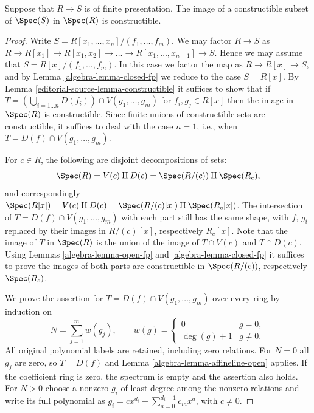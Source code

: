 \begin{theorem}
\label{editorial-source-theorem-chevalley}
Suppose that $R \to S$ is of finite presentation.
The image of a constructible subset of
$\Spec(S)$ in $\Spec(R)$ is constructible.
\end{theorem}

\begin{proof}
Write $S = R[x_1, \ldots, x_n]/(f_1, \ldots, f_m)$.
We may factor $R \to S$ as $R \to R[x_1] \to R[x_1, x_2]
\to \ldots \to R[x_1, \ldots, x_{n-1}] \to S$. Hence
we may assume that $S = R[x]/(f_1, \ldots, f_m)$.
In this case we factor the map as $R \to R[x] \to S$,
and by Lemma \ref{algebra-lemma-closed-fp} we reduce to
the case $S = R[x]$. By Lemma \ref{editorial-source-lemma-constructible} it suffices
to show that if
$T = (\bigcup_{i = 1\ldots n} D(f_i)) \cap V(g_1, \ldots, g_m)$
for $f_i , g_j \in R[x]$ then the image in $\Spec(R)$ is
constructible. Since finite unions of constructible sets
are constructible, it suffices to deal with the case $n = 1$,
i.e., when $T = D(f) \cap V(g_1, \ldots, g_m)$.

\medskip\noindent
For $c \in R$, the following are disjoint decompositions of sets:
$$
\Spec(R) =
V(c) \amalg D(c) =
\Spec(R/(c)) \amalg \Spec(R_c),
$$
and correspondingly $\Spec(R[x]) =
V(c) \amalg D(c) = \Spec(R/(c)[x]) \amalg
\Spec(R_c[x])$. The intersection of $T = D(f) \cap V(g_1, \ldots, g_m)$
with each part still has the same shape, with $f$, $g_i$ replaced
by their images in $R/(c)[x]$, respectively $R_c[x]$.
Note that the image of $T$
in $\Spec(R)$ is the union of the image of
$T \cap V(c)$ and $T \cap D(c)$. Using Lemmas \ref{algebra-lemma-open-fp}
and \ref{algebra-lemma-closed-fp} it suffices to prove the images of both
parts are constructible in $\Spec(R/(c))$, respectively
$\Spec(R_c)$.

\medskip\noindent
We prove the assertion for
$T=D(f)\cap V(g_1,\ldots,g_m)$ over every ring by induction on
$$
N=\sum_{j=1}^m w(g_j),\qquad
w(g)=\begin{cases}0&g=0,\\ \deg(g)+1&g\ne0.\end{cases}
$$
All original polynomial labels are retained, including zero relations.
For $N=0$ all $g_j$ are zero, so $T=D(f)$ and
Lemma \ref{algebra-lemma-affineline-open} applies. If the coefficient ring is
zero, the spectrum is empty and the assertion also holds. For $N>0$
choose a nonzero $g_i$ of least degree among the nonzero relations and
write its full polynomial as
$g_i=c x^{d_i}+\sum_{a=0}^{d_i-1}c_{ia}x^a$, with $c\ne0$.


\end{proof}
